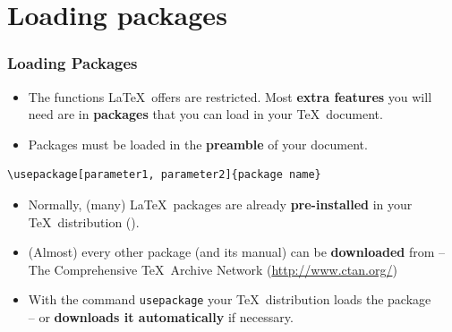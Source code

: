 \section{Loading packages}


\begin{frame}[fragile]
\frametitle{Loading Packages}

\begin{itemize}
	\item The functions \LaTeX\ offers are restricted. Most \textbf{extra features} you will need are in \textbf{packages} that you can load in your \TeX\ document.

	\item Packages must be loaded in the \textbf{preamble} of your document.
\end{itemize}

\begin{lstlisting}
\usepackage[parameter1, parameter2]{package name}
\end{lstlisting}

\pause 

\begin{itemize}
\item Normally, (many) \LaTeX\ packages are already  \textbf{pre-installed} in your \TeX\ distribution (\fe \href{http://miktex.org/}{}).

\item (Almost) every other package (and its manual) can be \textbf{downloaded} from \textbf{} -- The Comprehensive \TeX\ Archive Network (\url{http://www.ctan.org/})

\item With the command \lstinline|usepackage| your \TeX\ distribution loads the package\\
 -- or  \textbf{downloads it automatically} if necessary.

\end{itemize}
\end{frame}


